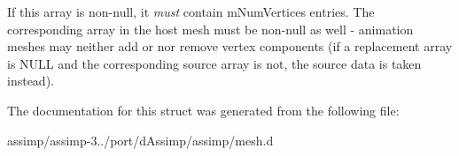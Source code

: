 If this array is non-\/null, it {\itshape must} contain m\+Num\+Vertices entries. The corresponding array in the host mesh must be non-\/null as well -\/ animation meshes may neither add or nor remove vertex components (if a replacement array is N\+U\+L\+L and the corresponding source array is not, the source data is taken instead). 

The documentation for this struct was generated from the following file\+:\begin{DoxyCompactItemize}
\item 
assimp/assimp-\/3../port/d\+Assimp/assimp/mesh.\+d\end{DoxyCompactItemize}
